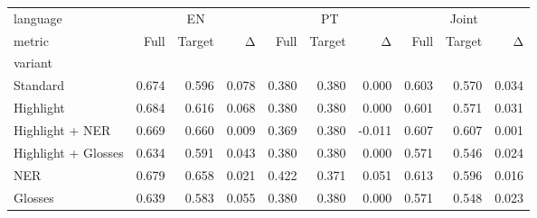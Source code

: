 \begin{tabular}{lrrrrrrrrr}
\toprule
language & \multicolumn{3}{c}{EN} & \multicolumn{3}{c}{PT} & \multicolumn{3}{c}{Joint} \\
metric & Full & Target & Δ & Full & Target & Δ & Full & Target & Δ \\
variant &  &  &  &  &  &  &  &  &  \\
\midrule
Standard & 0.674 & 0.596 & 0.078 & 0.380 & 0.380 & 0.000 & 0.603 & 0.570 & 0.034 \\
Highlight & 0.684 & 0.616 & 0.068 & 0.380 & 0.380 & 0.000 & 0.601 & 0.571 & 0.031 \\
Highlight + NER & 0.669 & 0.660 & 0.009 & 0.369 & 0.380 & -0.011 & 0.607 & 0.607 & 0.001 \\
Highlight + Glosses & 0.634 & 0.591 & 0.043 & 0.380 & 0.380 & 0.000 & 0.571 & 0.546 & 0.024 \\
NER & 0.679 & 0.658 & 0.021 & 0.422 & 0.371 & 0.051 & 0.613 & 0.596 & 0.016 \\
Glosses & 0.639 & 0.583 & 0.055 & 0.380 & 0.380 & 0.000 & 0.571 & 0.548 & 0.023 \\
\bottomrule
\end{tabular}
